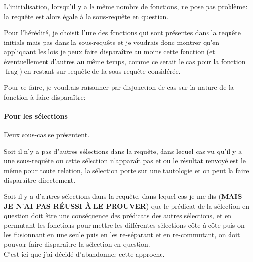 \documentclass[french]{article}
\DeclareMathOperator{\frag}{frag}
\begin{document}
L'initialisation, lorsqu'il y a le même nombre de fonctions, ne pose pas problème:
la requête est alors égale à la sous-requête en question.

Pour l'hérédité, je choisit l'une des fonctions qui sont présentes dans la requête  initiale
mais pas dans la sous-requête et je voudrais donc montrer qu'en appliquant les lois
je peux faire disparaître au moins cette fonction (et éventuellement d'autres au même temps,
comme ce serait le cas pour la fonction $\frag$) en restant sur-requête de la sous-requête considérée.

Pour ce faire, je voudrais raisonner par disjonction de cas sur la nature de la fonction à faire disparaître:

\paragraph{Pour les sélections}
Deux sous-cas se présentent.

Soit il n'y a pas d'autres sélections dans la requête,
dans lequel cas vu qu'il y a une sous-requête ou cette sélection n'apparaît pas et 
ou le résultat renvoyé est le même pour toute relation, la sélection porte sur une tautologie
et on peut la faire disparaître directement.

Soit il y a d'autres sélections dans la requête,
dans lequel cas je me dis (\textbf{MAIS JE N'AI PAS RÉUSSI À LE PROUVER})
que le prédicat de la sélection en question doit être une conséquence
des prédicats des autres sélections, et en permutant les fonctions pour
mettre les différentes sélections côte à côte puis on les fusionnant en une
seule puis en les re-séparant et en re-commutant, on doit pouvoir faire disparaître
la sélection en question. \\

C'est ici que j'ai décidé d'abandonner cette approche.
\end{document}
